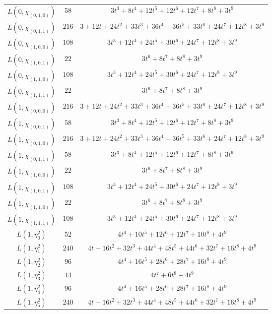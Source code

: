 \begin{center}
\begin{tabular}{c|c|c}
$L(0,\chi_{(0,1,0)})$ & $58$ & $3t^{3} + 8t^{4} + 12t^{5} + 12t^{6} + 12t^{7} + 8t^{8} + 3t^{9}$ \\
$L(0,\chi_{(0,1,1)})$ & $216$ & $3 + 12t + 24t^{2} + 33t^{3} + 36t^{4} + 36t^{5} + 33t^{6} + 24t^{7} + 12t^{8} + 3t^{9}$ \\
$L(0,\chi_{(1,0,0)})$ & $108$ & $3t^{3} + 12t^{4} + 24t^{5} + 30t^{6} + 24t^{7} + 12t^{8} + 3t^{9}$ \\
$L(0,\chi_{(1,0,1)})$ & $22$ & $3t^{6} + 8t^{7} + 8t^{8} + 3t^{9}$ \\
$L(0,\chi_{(1,1,0)})$ & $108$ & $3t^{3} + 12t^{4} + 24t^{5} + 30t^{6} + 24t^{7} + 12t^{8} + 3t^{9}$ \\
$L(0,\chi_{(1,1,1)})$ & $22$ & $3t^{6} + 8t^{7} + 8t^{8} + 3t^{9}$ \\
$L(1,\chi_{(0,0,0)})$ & $216$ & $3 + 12t + 24t^{2} + 33t^{3} + 36t^{4} + 36t^{5} + 33t^{6} + 24t^{7} + 12t^{8} + 3t^{9}$ \\
$L(1,\chi_{(0,0,1)})$ & $58$ & $3t^{3} + 8t^{4} + 12t^{5} + 12t^{6} + 12t^{7} + 8t^{8} + 3t^{9}$ \\
$L(1,\chi_{(0,1,0)})$ & $216$ & $3 + 12t + 24t^{2} + 33t^{3} + 36t^{4} + 36t^{5} + 33t^{6} + 24t^{7} + 12t^{8} + 3t^{9}$ \\
$L(1,\chi_{(0,1,1)})$ & $58$ & $3t^{3} + 8t^{4} + 12t^{5} + 12t^{6} + 12t^{7} + 8t^{8} + 3t^{9}$ \\
$L(1,\chi_{(1,0,0)})$ & $22$ & $3t^{6} + 8t^{7} + 8t^{8} + 3t^{9}$ \\
$L(1,\chi_{(1,0,1)})$ & $108$ & $3t^{3} + 12t^{4} + 24t^{5} + 30t^{6} + 24t^{7} + 12t^{8} + 3t^{9}$ \\
$L(1,\chi_{(1,1,0)})$ & $22$ & $3t^{6} + 8t^{7} + 8t^{8} + 3t^{9}$ \\
$L(1,\chi_{(1,1,1)})$ & $108$ & $3t^{3} + 12t^{4} + 24t^{5} + 30t^{6} + 24t^{7} + 12t^{8} + 3t^{9}$ \\
$L(1,\eta^{2}_{0})$ & $52$ & $4t^{4} + 10t^{5} + 12t^{6} + 12t^{7} + 10t^{8} + 4t^{9}$ \\
$L(1,\eta^{2}_{1})$ & $240$ & $4t + 16t^{2} + 32t^{3} + 44t^{4} + 48t^{5} + 44t^{6} + 32t^{7} + 16t^{8} + 4t^{9}$ \\
$L(1,\eta^{2}_{2})$ & $96$ & $4t^{4} + 16t^{5} + 28t^{6} + 28t^{7} + 16t^{8} + 4t^{9}$ \\
$L(1,\eta^{2}_{3})$ & $14$ & $4t^{7} + 6t^{8} + 4t^{9}$ \\
$L(1,\eta^{2}_{4})$ & $96$ & $4t^{4} + 16t^{5} + 28t^{6} + 28t^{7} + 16t^{8} + 4t^{9}$ \\
$L(1,\eta^{2}_{5})$ & $240$ & $4t + 16t^{2} + 32t^{3} + 44t^{4} + 48t^{5} + 44t^{6} + 32t^{7} + 16t^{8} + 4t^{9}$ \\

\end{tabular}
\end{center}
